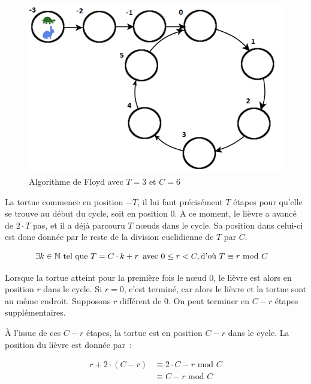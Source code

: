         \begin{figure}
          \center{}
          \includegraphics[scale=0.5]{Floyd.png}
          \caption{Algorithme de Floyd avec $T=3$ et $C=6$}
        \end{figure}

        La tortue commence en position $-T$, il lui faut précisément $T$ étapes pour qu'elle se trouve au début du cycle, soit en position $0$. A ce moment, le lièvre a avancé de $2 \cdot T$ pas, et il a déjà parcouru $T$ nœuds dans le cycle. Sa position dans celui-ci est donc donnée par le reste de la division euclidienne de $T$ par $C$.

        \begin{align*}
          \exists k \in \mathbb{N} \text{\ tel que } T = C \cdot k + r \text{\, avec } 0 \leq r < C, \text{d'où } T &\equiv r \text{\ mod } C
        \end{align*}

        Lorsque la tortue atteint pour la première fois le nœud $0$, le lièvre est alors en position $r$ dans le cycle. Si $r=0$, c'est terminé, car alors le lièvre et la tortue sont au même endroit. Supposons $r$ différent de $0$. On peut terminer en $C-r$ étapes supplémentaires.

        À l'issue de ces $C-r$ étapes, la tortue est en position $C-r$ dans le cycle. La position du lièvre est donnée par~:

        \begin{align*}
          r + 2 \cdot (C - r) &\equiv 2 \cdot C -r \text{\ mod } C \\
                              &\equiv C - r \text{\ mod } C
        \end{align*}

